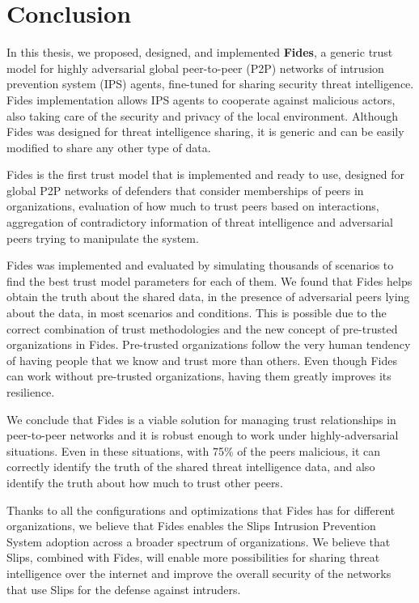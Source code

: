 \chapter{Conclusion}
\label{ch:conclusion}

In this thesis, we proposed, designed, and implemented \textbf{Fides}, a generic trust model for highly adversarial global peer-to-peer (P2P) networks of intrusion prevention system (IPS) agents, fine-tuned for sharing security threat intelligence. Fides implementation allows IPS agents to cooperate against malicious actors, also taking care of the security and privacy of the local environment. 
Although Fides was designed for threat intelligence sharing, it is generic and can be easily modified to share any other type of data. 

Fides is the first trust model that is implemented and ready to use, designed for global P2P networks of defenders that consider memberships of peers in organizations, evaluation of how much to trust peers based on interactions, aggregation of contradictory information of threat intelligence and adversarial peers trying to manipulate the system.

Fides was implemented and evaluated by simulating thousands of scenarios to find the best trust model parameters for each of them. We found that Fides helps obtain the truth about the shared data, in the presence of adversarial peers lying about the data, in most scenarios and conditions. This is possible due to the correct combination of trust methodologies and the new concept of pre-trusted organizations in Fides. Pre-trusted organizations follow the very human tendency of having people that we know and trust more than others. Even though Fides can work without pre-trusted organizations, having them greatly improves its resilience.

We conclude that Fides is a viable solution for managing trust relationships in peer-to-peer networks and it is robust enough to work under highly-adversarial situations. Even in these situations, with 75\% of the peers malicious, it can correctly identify the truth of the shared threat intelligence data, and also identify the truth about how much to trust other peers.

Thanks to all the configurations and optimizations that Fides has for different organizations, we believe that Fides enables the Slips Intrusion Prevention System adoption across a broader spectrum of organizations.
We believe that Slips, combined with Fides, will enable more possibilities for sharing threat intelligence over the internet and improve the overall security of the networks that use Slips for the defense against intruders.


